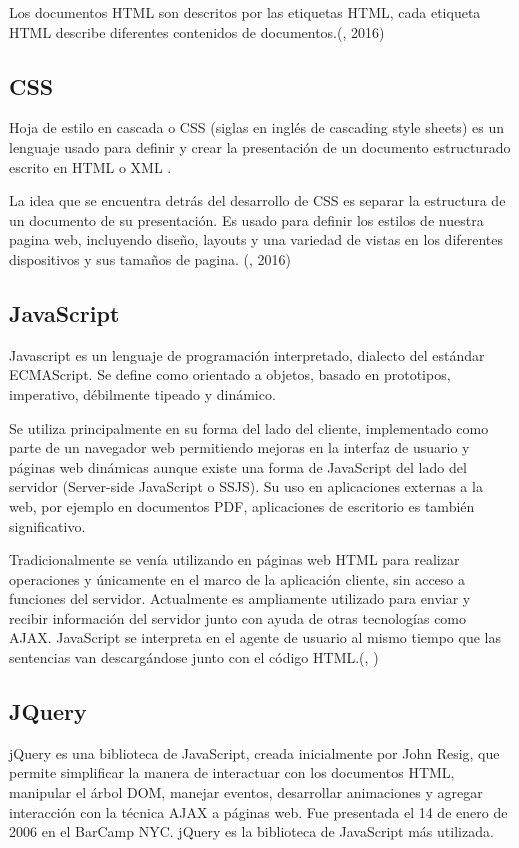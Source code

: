 Los documentos HTML son descritos por las etiquetas HTML, cada etiqueta HTML describe diferentes contenidos de documentos.(\citet{htmlbib}, 2016)

\setlength{\parskip}{0mm}

\subsection{CSS}
\setlength{\parskip}{5mm}
Hoja de estilo en cascada o CSS (siglas en inglés de cascading style sheets) es un lenguaje usado para definir y crear la presentación de un documento estructurado escrito en HTML o XML . 

La idea que se encuentra detrás del desarrollo de CSS es separar la estructura de un documento de su presentación. Es usado para definir los estilos de nuestra pagina web, incluyendo diseño, layouts y una variedad de vistas en los diferentes dispositivos y sus tamaños de pagina. (\citet{cssbib}, 2016)
\setlength{\parskip}{0mm}

\subsection{JavaScript}
\setlength{\parskip}{5mm}
Javascript es un lenguaje de programación interpretado, dialecto del estándar ECMAScript. Se define como orientado a objetos, basado en prototipos, imperativo, débilmente tipeado y dinámico.

Se utiliza principalmente en su forma del lado del cliente, implementado como parte de un navegador web permitiendo mejoras en la interfaz de usuario y páginas web dinámicas aunque existe una forma de JavaScript del lado del servidor (Server-side JavaScript o SSJS). Su uso en aplicaciones externas a la web, por ejemplo en documentos PDF, aplicaciones de escritorio es también significativo.

Tradicionalmente se venía utilizando en páginas web HTML para realizar operaciones y únicamente en el marco de la aplicación cliente, sin acceso a funciones del servidor. Actualmente es ampliamente utilizado para enviar y recibir información del servidor junto con ayuda de otras tecnologías como AJAX. JavaScript se interpreta en el agente de usuario al mismo tiempo que las sentencias van descargándose junto con el código HTML.(\citeauthor{javascripbib}, \citeyear{javascripbib})
\setlength{\parskip}{0mm}


\subsection{JQuery}
\setlength{\parskip}{5mm}
jQuery es una biblioteca de JavaScript, creada inicialmente por John Resig, que permite simplificar la manera de interactuar con los documentos HTML, manipular el árbol DOM, manejar eventos, desarrollar animaciones y agregar interacción con la técnica AJAX a páginas web. Fue presentada el 14 de enero de 2006 en el BarCamp NYC. jQuery es la biblioteca de JavaScript más utilizada.


